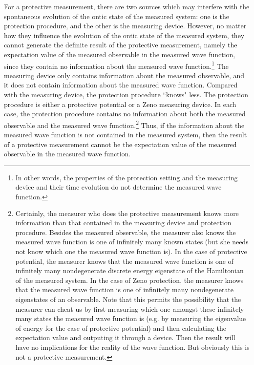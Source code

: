 For a protective measurement, there are two sources which may interfere with the spontaneous evolution of the ontic state of the measured system: one is the protection procedure, and the other is the measuring device. 
However, no matter how they influence the evolution of the ontic state of the measured system, they cannot generate the definite result of the protective measurement, namely the expectation value of the measured observable in the measured wave function, since they contain no information about the measured wave function.\footnote{In other words, the properties of the protection setting and the measuring device and their time evolution do not determine the measured wave function.}  %
The measuring device only contains information about the measured observable, and it does not contain information about the measured wave function. Compared with the measuring device, the protection procedure ``knows" less. 
The protection procedure is either a protective potential or a Zeno measuring device. In each case, the protection procedure contains no information about both the measured observable and the measured wave function.\footnote{Certainly, the measurer who does the protective measurement knows more information than that contained in the measuring device and protection procedure. Besides the measured observable, the measurer also knows the measured wave function is one of infinitely many known states (but she needs not know which one the measured wave function is). In the case of protective potential, the measurer knows that the measured wave function is one of infinitely many nondegenerate discrete energy eigenstate of the Hamiltonian of the measured system. In the case of Zeno protection, the measurer knows that the measured wave function is one of infinitely many nondegenerate eigenstates of an observable. Note that this permits the possibility that the measurer can cheat us by first measuring which one amongst these infinitely many states the measured wave function is (e.g. by measuring the eigenvalue of energy for the case of protective potential) and then calculating the expectation value and outputing it through a device. Then the result will have no implications for the reality of the wave function. But obviously this is not a protective measurement.}   
Thus, if the information about the measured wave function is not contained in the measured system, then the result of a protective measurement cannot be the expectation value of the measured observable in the measured wave function.  %

